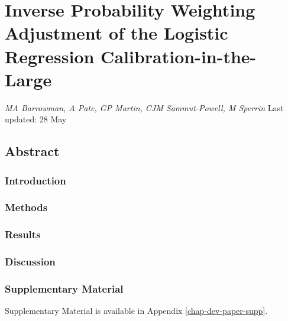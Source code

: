 \documentclass[12pt,PhD,twoside,openright]{muthesis}
\begin{document}
\hypertarget{chap-IPCW-logistic}{%
\chapter{Inverse Probability Weighting Adjustment of the Logistic Regression Calibration-in-the-Large}\label{chap-IPCW-logistic}}

\emph{MA Barrowman, A Pate, GP Martin, CJM Sammut-Powell, M Sperrin}
Last updated: 28 May

\hypertarget{abstract-1}{%
\section*{Abstract}\label{abstract-1}}

\hypertarget{introduction-3}{%
\subsection*{Introduction}\label{introduction-3}}

\hypertarget{methods-3}{%
\subsection*{Methods}\label{methods-3}}

\hypertarget{results-2}{%
\subsection*{Results}\label{results-2}}

\hypertarget{discussion-1}{%
\subsection*{Discussion}\label{discussion-1}}

\hypertarget{supplementary-material-1}{%
\subsection*{Supplementary Material}\label{supplementary-material-1}}

Supplementary Material is available in Appendix \ref{chap-dev-paper-supp}.
\end{document}
